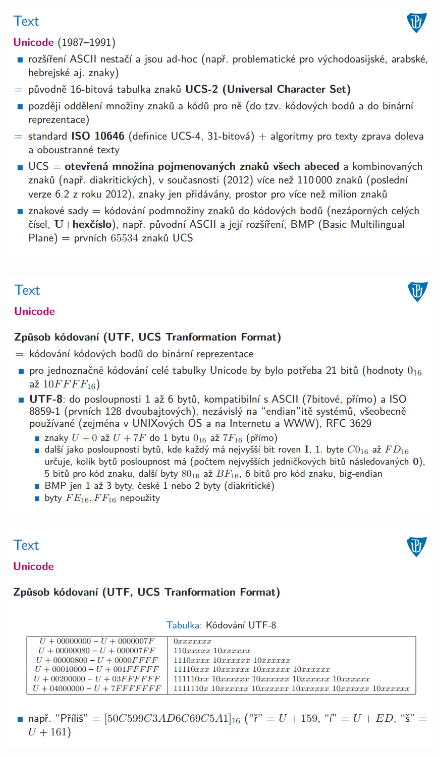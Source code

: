 \documentclass[10pt,a4paper]{article}
\begin{document}
\begin{figure} [h]
	\includegraphics[scale=0.65]{img/prvni_odstavec/otazka3/text6.png}	
\end{figure}

\begin{figure} [h]
	\includegraphics[scale=0.65]{img/prvni_odstavec/otazka3/text7.png}	
\end{figure}

\clearpage
\begin{figure} [h]
	\includegraphics[scale=0.65]{img/prvni_odstavec/otazka3/text8.png}	
\end{figure}
\end{document}
